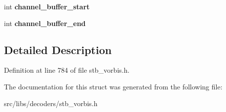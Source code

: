 \begin{DoxyCompactItemize}
\item 
\hypertarget{structstb__vorbis_af0bf960e2d513d207ee6a9f38eefe770}{int {\bfseries channel\-\_\-buffer\-\_\-start}}\label{structstb__vorbis_af0bf960e2d513d207ee6a9f38eefe770}

\item 
\hypertarget{structstb__vorbis_ab0c6866c39ae3cd00d5ede2dd5ff512c}{int {\bfseries channel\-\_\-buffer\-\_\-end}}\label{structstb__vorbis_ab0c6866c39ae3cd00d5ede2dd5ff512c}

\end{DoxyCompactItemize}


\subsection{Detailed Description}


Definition at line 784 of file stb\-\_\-vorbis.\-h.



The documentation for this struct was generated from the following file\-:\begin{DoxyCompactItemize}
\item 
src/libs/decoders/stb\-\_\-vorbis.\-h\end{DoxyCompactItemize}
